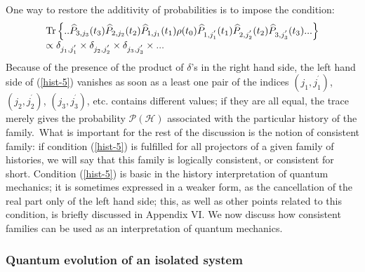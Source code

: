 \documentclass[12pt,onecolumn]{article}%
\begin{document}
One way to restore the additivity of probabilities is to impose the condition:%
\begin{equation}%
\begin{array}
[c]{l}%
\text{Tr}\left\{  ..\widehat{P}_{3,j_{3}}(t_{3})\widehat{P}_{2,j_{2}}%
(t_{2})\widehat{P}_{1,j_{1}}(t_{1})\rho(t_{0})\widehat{P}_{1,j_{1}^{^{\prime}%
}}(t_{1})\widehat{P}_{2,j_{2}^{^{\prime}}}(t_{2})\widehat{P}_{3,j_{3}%
^{^{\prime}}}(t_{3})...\right\} \\
\propto\delta_{j_{1},j_{1}^{^{\prime}}}\times\delta_{j_{2},j_{2}^{^{\prime}}%
}\times\delta_{j_{3},j_{3}^{^{\prime}}}\times...
\end{array}
\label{hist-5}%
\end{equation}
Because of the presence of the product of $\delta$'s in the right hand side,
the left hand side of (\ref{hist-5}) vanishes as soon as a least one pair of
the indices $(j_{1},j_{1}^{^{\prime}})$, $(j_{2},j_{2}^{^{\prime}})$,
$(j_{3},j_{3}^{^{\prime}})$, etc. contains different values; if they are all
equal, the trace merely gives the probability $\mathcal{P}(\mathcal{H})$
associated with the particular history of the family.\ What is important for
the rest of the discussion is the notion of consistent family: if condition
(\ref{hist-5}) is fulfilled for all projectors of a given family of histories,
we will say that this family is logically consistent, or consistent for short.
Condition (\ref{hist-5}) is basic in the history interpretation of quantum
mechanics; it is sometimes expressed in a weaker form, as the cancellation of
the real part only of the left hand side; this, as well as other points
related to this condition, is briefly discussed in Appendix VI. We now discuss
how consistent families can be used as an interpretation of quantum mechanics.

\subsubsection{Quantum evolution of an isolated system}
\end{document}
